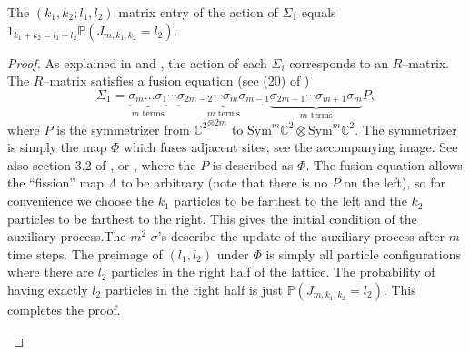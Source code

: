 \documentclass[12pt]{ximera}
\begin{document}
\begin{lemma}
The $(k_1,k_2;l_1,l_2)$ matrix entry of the action of $\Sigma_1$ equals $1_{k_1+k_2=l_1+l_2}\mathbb{P}(J_{m,k_1,k_2}=l_2)$. 
\end{lemma}
\begin{proof}
As explained in \cite{crampe2020fused} and \cite{crampebax}, the action of each $\Sigma_i$ corresponds to an $R$--matrix. The $R$--matrix satisfies a fusion equation (see (20) of \cite{crampebax})
$$
\Sigma_1 =   \underbrace{ \sigma_{m}\ldots \sigma_1}_{m \text{ terms}} \cdots \underbrace{\sigma_{2m-2} \cdots  \sigma_{m}\sigma_{m-1}}_{m \text{ terms}}  \underbrace{\sigma_{2m-1} \cdots \sigma_{m+1}\sigma_m}_{m \text{ terms}} P,
$$
where $P$ is the symmetrizer from ${\mathbb{C}^2}^{\otimes 2m}$ to $\mathrm{Sym}^m \mathbb{C}^2 \otimes \mathrm{Sym}^m \mathbb{C}^2$. The symmetrizer is simply the map $\Phi$ which fuses adjacent sites; see the accompanying image. See also section 3.2 of \cite{KuanCMP}, or \cite{KuanSF}, where the $P$ is described as $\Phi$. The fusion equation allows the ``fission'' map $\Lambda$ to be arbitrary (note that there is no $P$ on the left), so for convenience we choose the $k_1$ particles to be farthest to the left and the $k_2$ particles to be farthest to the right. This gives the initial condition of the auxiliary process.The $m^2$ $\sigma$'s describe the update of the auxiliary process after $m$ time steps. The preimage of $(l_1,l_2)$ under $\Phi$ is simply all particle configurations where there are $l_2$ particles in the right half of the lattice. The probability of having exactly $l_2$ particles in the right half is just $\mathbb{P}(J_{m,k_1,k_2}=l_2)$. This completes the proof.


\begin{figure}\label{LP}
\begin{center}
\end{center}
\end{figure}


\end{proof}
\end{document}
